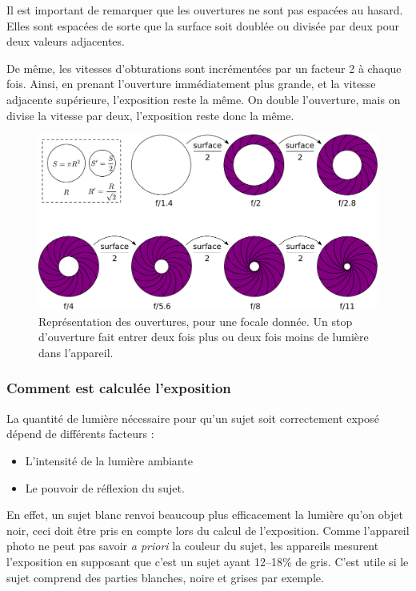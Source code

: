 \documentclass[a4paper,twoside]{article}
\begin{document}
\begin{remarque}
Il est important de remarquer que les ouvertures ne sont pas espacées au hasard. Elles sont espacées de sorte que la surface soit doublée ou divisée par deux pour deux valeurs adjacentes. 

De même, les vitesses d'obturations sont incrémentées par un facteur 2 à chaque fois. Ainsi, en prenant l'ouverture immédiatement plus grande, et la vitesse adjacente supérieure, l'exposition reste la même. On double l'ouverture, mais on divise la vitesse par deux, l'exposition reste donc la même.
\end{remarque}

\begin{figure}[htb]
\centering
\includegraphics[width=0.65\linewidth]{figure/aperture.pdf}
\caption{Représentation des ouvertures, pour une focale donnée. Un stop d'ouverture fait entrer deux fois plus ou deux fois moins de lumière dans l'appareil.}\label{fig:ouverture}
\end{figure}

\subsubsection{Comment est calculée l'exposition}
La quantité de lumière nécessaire pour qu'un sujet soit correctement exposé dépend de différents facteurs :
\begin{itemize}
\item L'intensité de la lumière ambiante
\item Le pouvoir de réflexion du sujet.
\end{itemize}

En effet, un sujet blanc renvoi beaucoup plus efficacement la lumière qu'on objet noir, ceci doit être pris en compte lors du calcul de l'exposition. Comme l'appareil photo ne peut pas savoir \emph{a priori} la couleur du sujet, les appareils mesurent l'exposition en supposant que c'est un sujet ayant 12--18\% de gris. C'est utile si le sujet comprend des parties blanches, noire et grises par exemple. 
\end{document}
